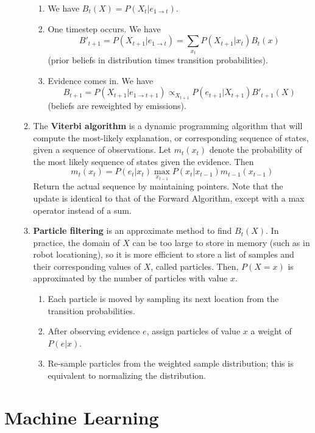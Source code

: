 \documentclass[10pt]{article}
\begin{document}
\begin{multicols}{2}
\begin{enumerate}
\begin{enumerate}
        \begin{enumerate}
            \item We have $B_t(X)=P(X_t | e_{1 \rightarrow t})$.
            \item One timestep occurs. We have $$B'_{t+1}=P(X_{t+1} | e_{1 \rightarrow t}) = \sum_{x_t} P(X_{t+1} | x_t)B_t(x)$$ (prior beliefs in distribution times transition probabilities).
            \item Evidence comes in. We have $$B_{t+1}=P(X_{t+1} | e_{1 \rightarrow t+1}) \propto_{X_{t+1}} P(e_{t+1} | X_{t+1}) B'_{t+1}(X)$$ (beliefs are reweighted by emissions).
        \end{enumerate}
        \item The \textbf{Viterbi algorithm} is a dynamic programming algorithm that will compute the most-likely explanation, or corresponding sequence of states, given a sequence of observations. Let $m_t(x_t)$ denote the probability of the most likely sequence of states given the evidence. Then $$m_t(x_t) = P(e_t | x_t) \max_{x_{t-1}}P(x_t | x_{t-1})m_{t-1}(x_{t-1})$$
        Return the actual sequence by maintaining pointers. Note that the update is identical to that of the Forward Algorithm, except with a max operator instead of a sum.
        \item \textbf{Particle filtering} is an approximate method to find $B_t(X)$. In practice, the domain of $X$ can be too large to store in memory (such as in robot locationing), so it is more efficient to store a list of samples and their corresponding values of $X$, called particles. Then, $P(X=x)$ is approximated by the number of particles with value $x$.
        \begin{enumerate}
            \item Each particle is moved by sampling its next location from the transition probabilities. 
            \item After observing evidence $e$, assign particles of value $x$ a weight of $P(e|x)$. 
            \item Re-sample particles from the weighted sample distribution; this is equivalent to normalizing the distribution. 
        \end{enumerate}
    \end{enumerate}
\end{enumerate}
\section{Machine Learning}
\begin{enumerate}

\end{enumerate}
\end{multicols}
\end{document}
